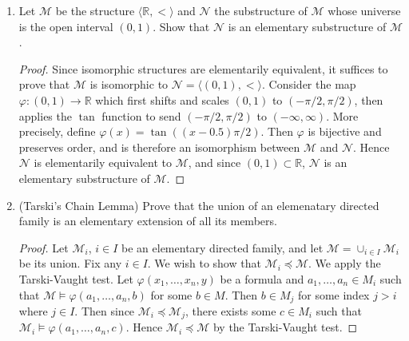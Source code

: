 \documentclass{article}
\begin{document}
\begin{enumerate}
\begin{enumerate}
\begin{proof}
          For each $n\in\mathbb{N}\setminus\{0,1\}$, $S_n$ is unique,
          hence we have infinitely many minimal definable and infinite
          subsets $S_n$.
        \end{proof}
    \end{enumerate}

  \item Let $\mathcal{M}$ be the structure
    $\langle\mathbb{R},<\rangle$ and $\mathcal{N}$ the substructure of
    $\mathcal{M}$ whose universe is the open interval $(0,1)$. Show
    that $\mathcal{N}$ is an elementary substructure of $\mathcal{M}$.

    \begin{proof}
      Since isomorphic structures are elementarily equivalent, it
      suffices to prove that $\mathcal{M}$ is isomorphic to
      $\mathcal{N}=\langle(0,1),<\rangle$. Consider the map
      $\varphi:(0,1)\rightarrow\mathbb{R}$ which first
      shifts and scales $(0,1)$ to $(-\pi/2,\pi/2)$, then applies the
      $\tan$ function to send $(-\pi/2,\pi/2)$ to $(-\infty,\infty)$.
      More precisely, define $\varphi(x)=\tan((x-0.5)\pi/2)$. Then
      $\varphi$ is bijective and preserves order, and is therefore an
      isomorphism between $\mathcal{M}$ and $\mathcal{N}$. Hence
      $\mathcal{N}$ is elementarily equivalent to $\mathcal{M}$, and
      since $(0,1)\subset\mathbb{R}$, $\mathcal{N}$ is an elementary
      substructure of $\mathcal{M}$.
    \end{proof}

  \item (Tarski's Chain Lemma) Prove that the union of an elemenatary
    directed family is an elementary extension of all its members.
    \begin{proof}
      Let $\mathcal{M}_i$, $i\in I$ be an elementary directed family, and
      let $\mathcal{M}=\cup_{i\in I}\mathcal{M}_i$ be its union. Fix any
      $i\in I$. We wish to show that $\mathcal{M}_i\preceq\mathcal{M}$. We
      apply the Tarski-Vaught test. Let $\varphi(x_1,\ldots,x_n,y)$ be a
      formula and $a_1,\ldots,a_n\in M_i$ such that
      $\mathcal{M}\vDash\varphi(a_1,\ldots,a_n,b)$ for some $b\in M$. Then
      $b\in M_j$ for some index $j>i$ where $j\in I$. Then since
      $\mathcal{M}_i\preceq\mathcal{M}_j$, there exists some $c\in M_i$
      such that $\mathcal{M}_i\vDash\varphi(a_1,\ldots,a_n,c)$. Hence
      $\mathcal{M}_i\preceq\mathcal{M}$ by the Tarski-Vaught test.
    \end{proof}
\end{enumerate}
\end{document}
